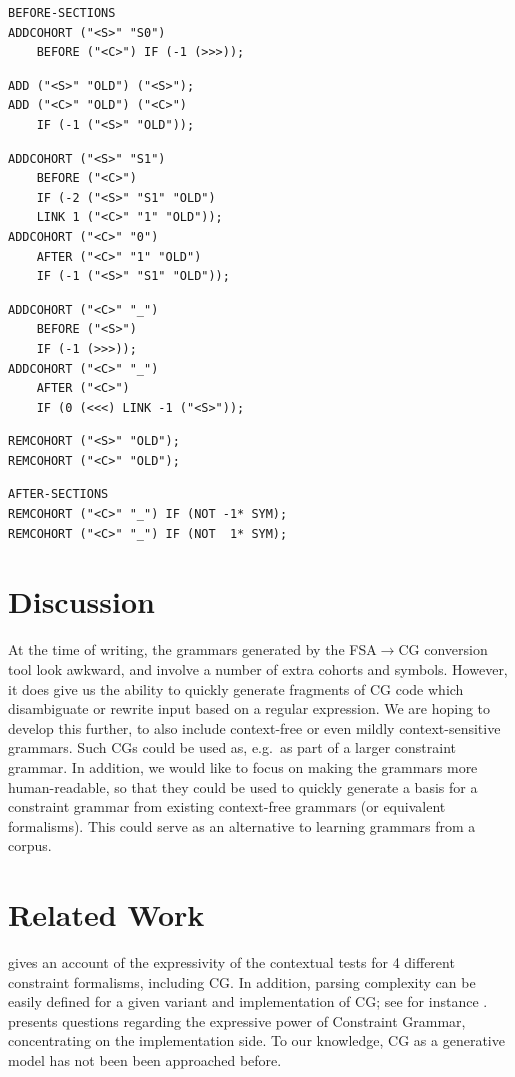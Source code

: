 \documentclass[11pt]{article}
\begin{document}
\begin{Verbatim}
BEFORE-SECTIONS
ADDCOHORT ("<S>" "S0") 
    BEFORE ("<C>") IF (-1 (>>>));
\end{Verbatim}

\begin{Verbatim}
ADD ("<S>" "OLD") ("<S>");
ADD ("<C>" "OLD") ("<C>")
    IF (-1 ("<S>" "OLD"));
\end{Verbatim}

\begin{Verbatim}
ADDCOHORT ("<S>" "S1")
    BEFORE ("<C>")
    IF (-2 ("<S>" "S1" "OLD") 
    LINK 1 ("<C>" "1" "OLD"));
ADDCOHORT ("<C>" "0")
    AFTER ("<C>" "1" "OLD")
    IF (-1 ("<S>" "S1" "OLD"));
\end{Verbatim}

\begin{Verbatim}
ADDCOHORT ("<C>" "_")
    BEFORE ("<S>")
    IF (-1 (>>>));
ADDCOHORT ("<C>" "_") 
    AFTER ("<C>")
    IF (0 (<<<) LINK -1 ("<S>"));
\end{Verbatim}

\begin{Verbatim}
REMCOHORT ("<S>" "OLD");
REMCOHORT ("<C>" "OLD");
\end{Verbatim}

\begin{Verbatim}
AFTER-SECTIONS
REMCOHORT ("<C>" "_") IF (NOT -1* SYM);
REMCOHORT ("<C>" "_") IF (NOT  1* SYM);
\end{Verbatim}

\section{Discussion}
At the time of writing, the grammars generated by the FSA$\rightarrow$CG
conversion tool look awkward, and involve a number of extra cohorts and symbols.
However, it does give us the ability to quickly generate fragments of CG code
which disambiguate or rewrite input based on a regular expression.
We are hoping to develop this further, to also include context-free or even
mildly context-sensitive grammars.
Such CGs could be used as, e.g.\ as part of a larger constraint grammar.
In addition, we would like to focus on making the grammars more human-readable,
so that they could be used to quickly generate a basis for a constraint grammar
from existing context-free grammars (or equivalent formalisms).
This could serve as an alternative to learning grammars from a corpus.


\section{Related Work}
 gives an account of the expressivity of
the contextual tests for 4 different constraint formalisms, including CG. 
In addition, parsing complexity can be easily defined for a given variant and 
implementation of CG; see for instance .
 presents questions regarding the expressive power
of Constraint Grammar, concentrating on the implementation side.
To our knowledge, CG as a generative model has not been been approached before.



\end{document}

